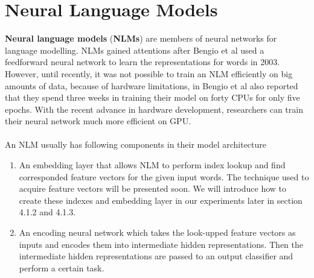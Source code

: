 	\section{Neural Language Models}
	\textbf{Neural language models} (\textbf{NLMs}) are members of neural networks for language modelling. 
	NLMs gained attentions after Bengio et al \cite{bengio2003neural} used a feedforward neural network to learn the representations for words in 2003. 
	However, until recently,  it was not possible to train an NLM efficiently on big amounts of data, because of hardware limitations, in Bengio et al\cite{bengio2003neural} also reported that they spend three weeks in training their model on forty CPUs for only five epochs. 
	With the recent advance in hardware development, researchers can train their neural network much more efficient on GPU.\\\\
	An NLM usually has following components in their model architecture\cite{collobert2008unified,collobert2011natural}
	\begin{enumerate}
		\item An embedding layer that allows NLM to perform index lookup and find corresponded feature vectors for the given input words. 
		The technique used to acquire feature vectors will be presented soon. 
		We will introduce how to create these indexes and embedding layer in our experiments later in section 4.1.2 and 4.1.3.
		\item An encoding neural network which takes the look-upped feature vectors as inputs and encodes them into intermediate hidden representations.
		Then the intermediate hidden representations are passed to an output classifier and perform a certain task.
	\end{enumerate}
